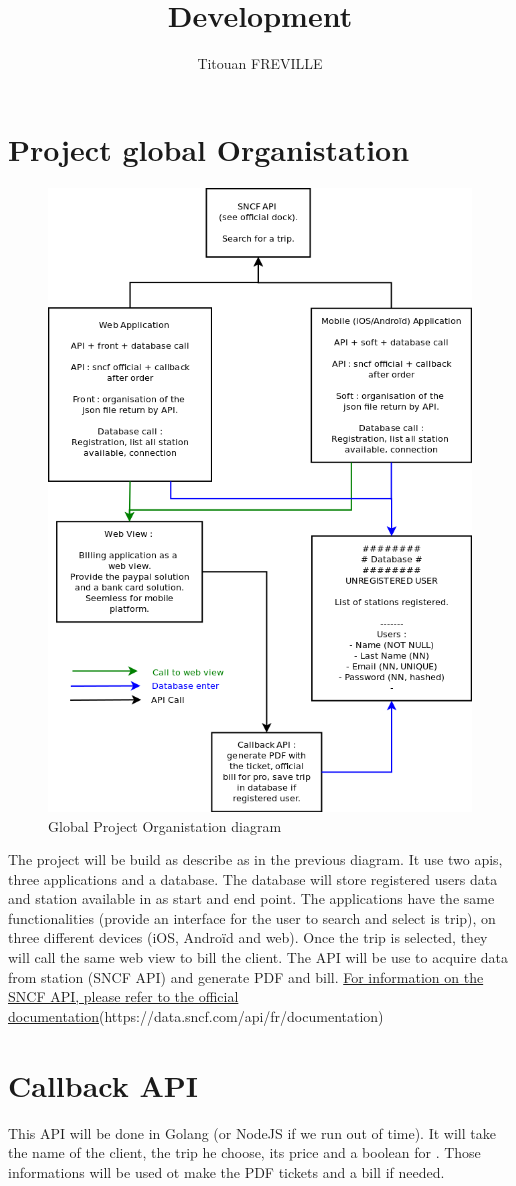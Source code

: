 \documentclass[a4paper,10pt]{report}
\title{Development}
\author{Titouan FREVILLE}
\begin{document}
\maketitle
\tableofcontents
\listoffigures
\begin{abstract}
\end{abstract}

\part{Project global Organistation}
  \begin{figure}[h!]
    \centering
    \caption{\label{gpo} Global Project Organistation diagram}
    \includegraphics[scale=0.5]{./diagrams/gpo.png}
  \end{figure}
  The project will be build as describe as in the previous diagram. It use two 
apis, three applications and a database. The database will store registered 
users data and station available in as start and end point. The applications 
have the same functionalities (provide an interface for the user to search and 
select is trip), on three different devices (iOS, Androïd and web). Once the 
trip is selected, they will call the same web view to bill the client. The API 
will be use to acquire data from station (SNCF API) and generate PDF and bill. 
\href{https://data.sncf.com/api/fr/documentation}{For information on the SNCF 
API, please refer to the official 
documentation}(https://data.sncf.com/api/fr/documentation) 
\part{Callback API}
  This API will be done in Golang (or NodeJS if we run out of time). It will take the name of the client, the trip he choose, its price and a boolean
  for . Those informations
  will be used ot make the PDF tickets and a bill if needed.
\end{document}
